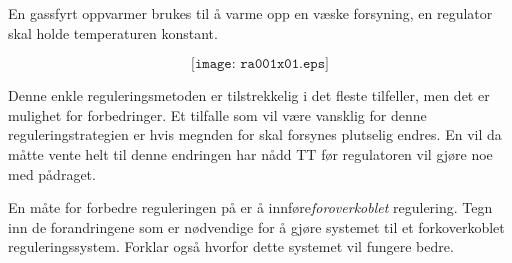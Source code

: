 


En gassfyrt oppvarmer brukes til å varme opp en væske forsyning, en regulator skal holde temperaturen konstant.

$$\texttt{[image: ra001x01.eps]}$$

Denne enkle reguleringsmetoden er tilstrekkelig i det fleste tilfeller, men det er mulighet for forbedringer. Et tilfalle som vil være vansklig for denne reguleringstrategien er hvis megnden for skal forsynes plutselig endres. En vil da måtte vente helt til denne endringen har nådd TT før regulatoren vil gjøre noe med pådraget. 

En måte for forbedre reguleringen på er å innføre{\it foroverkoblet} regulering. Tegn inn de forandringene som er nødvendige for å gjøre systemet til et forkoverkoblet reguleringssystem. Forklar også hvorfor dette systemet vil fungere bedre. 








